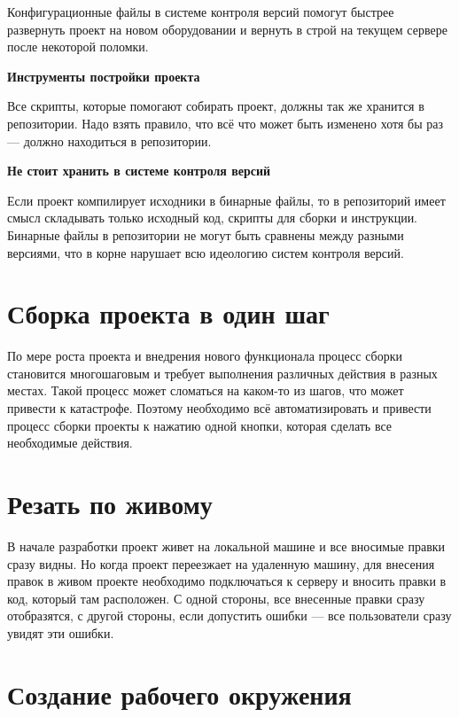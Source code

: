 Конфигурационные файлы в системе контроля версий помогут быстрее развернуть проект на новом оборудовании и вернуть в строй на текущем сервере после некоторой поломки.

\textbf{ Инструменты постройки проекта } %

Все скрипты, которые помогают собирать проект, должны так же хранится в репозитории. Надо взять правило, что всё что может быть изменено хотя бы раз --- должно находиться в репозитории.

\textbf{ Не стоит хранить в системе контроля версий } %

Если проект компилирует исходники в бинарные файлы, то в репозиторий имеет смысл складывать только исходный код, скрипты для сборки и инструкции. Бинарные файлы в репозитории не могут быть сравнены между разными версиями, что в корне нарушает всю идеологию систем контроля версий.


\section{ Сборка проекта в один шаг } \label{sect2_7}

По мере роста проекта и внедрения нового функционала процесс сборки становится многошаговым и требует выполнения различных действия в разных местах. Такой процесс может сломаться на каком-то из шагов, что может привести к катастрофе. Поэтому необходимо всё автоматизировать и привести процесс сборки проекты к нажатию одной кнопки, которая сделать все необходимые действия.

\section{ Резать по живому } \label{sect2_8}

В начале разработки проект живет на локальной машине и все вносимые правки сразу видны. Но когда проект переезжает на удаленную машину, для внесения правок в живом проекте необходимо подключаться к серверу и вносить правки в код, который там расположен. С одной стороны, все внесенные правки сразу отобразятся, с другой стороны, если допустить ошибки --- все пользователи сразу увидят эти ошибки.

\section{ Создание рабочего окружения } \label{sect2_9}


